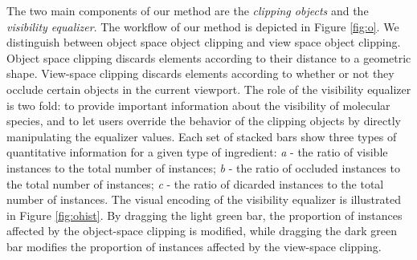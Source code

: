


The two main components of our method are the \emph{clipping objects} and the \emph{visibility equalizer}. 
The workflow of our method is depicted in Figure \ref{fig:o}.
We distinguish between object space object clipping and view space object clipping.
Object space clipping discards elements according to their distance to a geometric shape.
View-space clipping discards elements according to whether or not they occlude certain objects in the current viewport.
The role of the visibility equalizer is two fold: to provide important information about the visibility of molecular species, and to let users override the behavior of the clipping objects by directly manipulating the equalizer values. 
Each set of stacked bars show three types of quantitative information for a given type of ingredient: \emph{a} - the ratio of visible instances to the total number of instances; \emph{b} - the ratio of occluded instances to the total number of instances; \emph{c} - the ratio of dicarded instances to the total number of instances.
The visual encoding of the visibility equalizer is illustrated in Figure \ref{fig:ohist}.
By dragging the light green bar, the proportion of instances affected by the object-space clipping is modified, while dragging the dark green bar modifies the proportion of instances affected by the view-space clipping.

